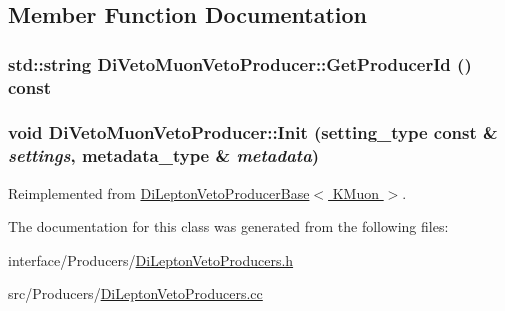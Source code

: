 \subsection{Member Function Documentation}
\hypertarget{classDiVetoMuonVetoProducer_a04e4bec0f13bc1262e3e19ada8d1a559}{
\subsubsection[{GetProducerId}]{\setlength{\rightskip}{0pt plus 5cm}std::string DiVetoMuonVetoProducer::GetProducerId () const}}
\label{classDiVetoMuonVetoProducer_a04e4bec0f13bc1262e3e19ada8d1a559}
\hypertarget{classDiVetoMuonVetoProducer_a094b025b9686518c03836d57fcf943ac}{
\subsubsection[{Init}]{\setlength{\rightskip}{0pt plus 5cm}void DiVetoMuonVetoProducer::Init (setting\_\-type const \& {\em settings}, \/  metadata\_\-type \& {\em metadata})}}
\label{classDiVetoMuonVetoProducer_a094b025b9686518c03836d57fcf943ac}


Reimplemented from \hyperlink{classDiLeptonVetoProducerBase_a759df02383c27e660029ce98bdac99ca}{DiLeptonVetoProducerBase$<$ KMuon $>$}.

The documentation for this class was generated from the following files:\begin{DoxyCompactItemize}
\item 
interface/Producers/\hyperlink{DiLeptonVetoProducers_8h}{DiLeptonVetoProducers.h}\item 
src/Producers/\hyperlink{DiLeptonVetoProducers_8cc}{DiLeptonVetoProducers.cc}\end{DoxyCompactItemize}
